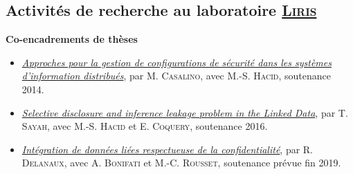 \documentclass[12pt,a4paper]{article}
\newcommand{\activite}[1]{\textbf{#1}\xspace}
\newcommand{\ECO}{E. \textsc{Coquery}\xspace}
\newcommand{\LIRIS}{\textsc{Liris}\xspace}
\begin{document}
\subsection*{Activités de recherche au laboratoire \href{https://liris.cnrs.fr/}{\LIRIS}}

\activite{Co-encadrements de thèses} 
    \begin{itemize}
      \item \emph{\href{https://www.theses.fr/2014LYO10124}{Approches pour la gestion de configurations de sécurité dans les systèmes d'information distribués}}, par M. \textsc{Casalino}, avec M.-S. \textsc{Hacid}, soutenance 2014.
      \item \emph{\href{https://www.theses.fr/2016LYSE1156}{Selective disclosure and inference leakage problem in the Linked Data}}, par T. \textsc{Sayah}, avec M.-S. \textsc{Hacid} et \ECO, soutenance 2016.
      \item \href{https://perso.liris.cnrs.fr/remy.delanaux/research.html}{\emph{Intégration de données liées respectueuse de la confidentialité}}, par R. \textsc{Delanaux}, avec A. \textsc{Bonifati} et M.-C. \textsc{Rousset}, soutenance prévue fin 2019.
    \end{itemize}
  
\end{document}
